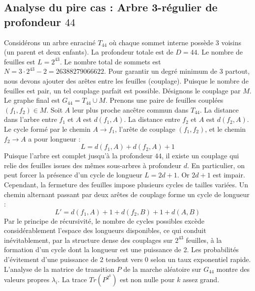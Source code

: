 \documentclass[11pt,a4paper]{article}
\begin{document}
\subsection{Analyse du pire cas : Arbre 3-régulier de profondeur $44$}
Considérons un arbre enraciné $T_{44}$ où chaque sommet interne possède 3 voisins (un parent et deux enfants).
La profondeur totale est de $D = 44$.
Le nombre de feuilles est $L = 2^{43}$.
Le nombre total de sommets est $N = 3 \cdot 2^{43} - 2 = 26388279066622$.
Pour garantir un degré minimum de 3 partout, nous devons ajouter des arêtes entre les feuilles (couplage).
Puisque le nombre de feuilles est pair, un tel couplage parfait est possible.
Désignons le couplage par $M$. Le graphe final est $G_{44} = T_{44} \cup M$.
Prenons une paire de feuilles couplées $(f_1, f_2) \in M$.
Soit $A$ leur plus proche ancêtre commun dans $T_{44}$.
La distance dans l'arbre entre $f_1$ et $A$ est $d(f_1, A)$.
La distance entre $f_2$ et $A$ est $d(f_2, A)$.
Le cycle formé par le chemin $A \to f_1$, l'arête de couplage $(f_1, f_2)$, et le chemin $f_2 \to A$ a pour longueur :
$$ L = d(f_1, A) + d(f_2, A) + 1 $$
Puisque l'arbre est complet jusqu'à la profondeur $44$, il existe un couplage qui relie des feuilles issues des mêmes sous-arbres à profondeur $d$.
En particulier, on peut forcer la présence d'un cycle de longueur $L = 2d + 1$. Or $2d+1$ est impair.
Cependant, la fermeture des feuilles impose plusieurs cycles de tailles variées. Un chemin alternant passant par deux arêtes de couplage forme un cycle de longueur :
$$ L' = d(f_1, A) + 1 + d(f_2, B) + 1 + d(A, B) $$
Par le principe de récursivité, le nombre de cycles possibles excède considérablement l'espace des longueurs disponibles, ce qui conduit inévitablement, par la structure dense des couplages sur $2^{43}$ feuilles, à la formation d'un cycle dont la longueur est une puissance de 2. Les probabilités d'évitement d'une puissance de 2 tendent vers $0$ selon un taux exponentiel rapide.
L'analyse de la matrice de transition $P$ de la marche aléatoire sur $G_{44}$ montre des valeurs propres $\lambda_i$. La trace $Tr(P^{2^k})$ est non nulle pour $k$ assez grand.
\end{document}
